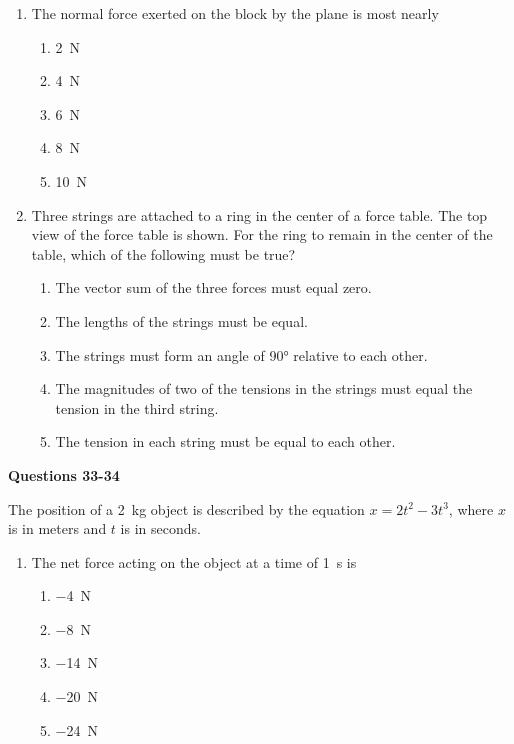 \documentclass{../../oss-apphys}
\begin{document}
\begin{multicols}{2}
\begin{enumerate}[resume,leftmargin=18pt]
  \item The normal force exerted on the block by the plane is most nearly
    \begin{enumerate}[noitemsep,topsep=0pt,leftmargin=18pt,label=(\Alph*)]
    \item\SI{2}{\newton}
    \item\SI{4}{\newton}
    \item\SI{6}{\newton}
    \item\SI{8}{\newton}
    \item\SI{10}{\newton}
    \end{enumerate}
    


  \item Three strings are attached to a ring in the center of a force table. The
    top view of the force table is shown. For the ring to remain in the
    center of the table, which of the following must be true?
    \begin{enumerate}[noitemsep,topsep=0pt,leftmargin=18pt,label=(\Alph*)]
    \item The vector sum of the three forces must equal zero.
    \item The lengths of the strings must be equal.
    \item The strings must form an angle of \ang{90} relative to each other.
    \item The magnitudes of two of the tensions in the strings must equal the
      tension in the third string.
    \item The tension in each string must be equal to each other.
    \end{enumerate}
  \end{enumerate}
  
  \textbf{Questions 33-34}

  The position of a \SI{2}{\kilo\gram} object is described by the equation
  $x=2t^2-3t^3$, where $x$ is in meters and $t$ is in seconds.
  \begin{enumerate}[resume,leftmargin=18pt]
  \item The net force acting on the object at a time of \SI{1}{s} is
    \begin{enumerate}[noitemsep,topsep=0pt,leftmargin=18pt,label=(\Alph*)]
    \item\SI{-4}{\newton}
    \item\SI{-8}{\newton}
    \item\SI{-14}{\newton}
    \item\SI{-20}{\newton}
    \item\SI{-24}{\newton}
    \end{enumerate}


\end{enumerate}
\end{multicols}
\end{document}
